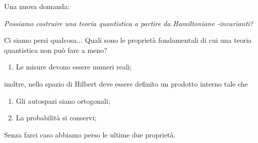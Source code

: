 \begin{frame}
    Una nuova domanda:
    \begin{center}
        {\it Possiamo costruire una teoria quantistica a partire da Hamiltoniane \PT-invarianti?}
    \end{center}
\end{frame}

\begin{frame}{Ci siamo persi qualcosa...}
    Quali sono le proprietà fondamentali di cui una teoria quantistica non può fare a meno?
    \begin{enumerate}
        \pause
        \item[\ding{51}] Le misure devono essere numeri reali;
    \end{enumerate}
    \pause
    inoltre, nello spazio di Hilbert deve essere definito un prodotto interno tale che
    \begin{enumerate}
        \pause
        \item[\ding{55}] Gli autospazi siano ortogonali;
        \pause
        \item[\ding{55}] La probabilità si conservi;
    \end{enumerate}
    \pause
    Senza farci caso abbiamo perso le ultime due proprietà.
\end{frame}
